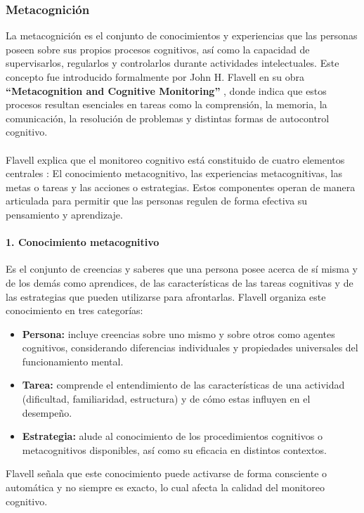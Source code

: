 \subsubsection{Metacognición}
La metacognición es el conjunto de conocimientos y experiencias que las personas poseen sobre sus propios procesos cognitivos, así como la capacidad de supervisarlos, regularlos y controlarlos durante actividades intelectuales. Este concepto fue introducido formalmente por John H. Flavell en su obra \textbf{“Metacognition and Cognitive Monitoring”} \cite{Flavell1979}, donde indica que estos procesos resultan esenciales en tareas como la comprensión, la memoria, la comunicación, la resolución de problemas y distintas formas de autocontrol cognitivo.
\\
\\
Flavell explica que el monitoreo cognitivo está constituido de cuatro elementos centrales \cite{Flavell1979}: El conocimiento metacognitivo, las experiencias metacognitivas, las metas o tareas y las acciones o estrategias. Estos componentes operan de manera articulada para permitir que las personas regulen de forma efectiva su pensamiento y aprendizaje.

\paragraph{1. Conocimiento metacognitivo}

Es el conjunto de creencias y saberes que una persona posee acerca de sí misma y de los demás como aprendices, de las características de las tareas cognitivas y de las estrategias que pueden utilizarse para afrontarlas. Flavell organiza este conocimiento en tres categorías:

\begin{itemize}
    \item \textbf{Persona:} incluye creencias sobre uno mismo y sobre otros como agentes cognitivos, considerando diferencias individuales y propiedades universales del funcionamiento mental.
    \item \textbf{Tarea:} comprende el entendimiento de las características de una actividad (dificultad, familiaridad, estructura) y de cómo estas influyen en el desempeño.
    \item \textbf{Estrategia:} alude al conocimiento de los procedimientos cognitivos o metacognitivos disponibles, así como su eficacia en distintos contextos.
\end{itemize}

Flavell señala que este conocimiento puede activarse de forma consciente o automática y no siempre es exacto, lo cual afecta la calidad del monitoreo cognitivo.

